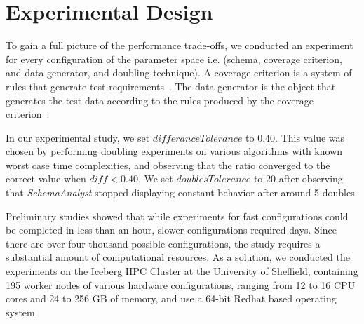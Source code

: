 \section{Experimental Design}

To gain a full picture of the performance trade-offs, we
conducted an experiment for every configuration of the
parameter space i.e. (schema, coverage criterion, and data
generator, and doubling technique). A coverage criterion is a system of rules that
generate test requirements~\cite{Ammann:Testing}. The data generator is the
object that generates the test data according to the rules
produced by the coverage criterion~\cite{Ammann:Testing}.

In our experimental study, we set $\mathit{differanceTolerance}$ to
$0.40$. This value was chosen by performing doubling
experiments on various algorithms with known worst case time
complexities, and observing that the ratio converged to the correct
value when $\mathit{diff} < 0.40$.
We set $\mathit{doublesTolerance}$ to $20$ after observing that
\textit{SchemaAnalyst} stopped displaying constant behavior after around
5 doubles.

Preliminary studies showed that while experiments for
fast configurations could be completed in less than an
hour, slower configurations required days. Since there
are over four thousand possible configurations, the study
requires a substantial amount of computational resources.
As a solution, we conducted the experiments on the Iceberg
HPC Cluster at the University of Sheffield, containing
195 worker nodes of various hardware configurations,
ranging from 12 to 16 CPU cores and 24 to 256 GB of
memory, and use a 64-bit Redhat based operating system.
